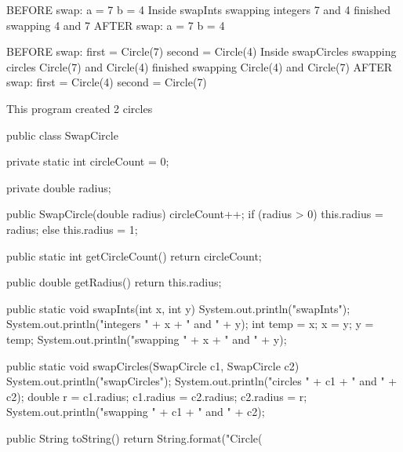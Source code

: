 \begin{answer}[14em]
\begin{minipage}{190pt}

\begin{javaans}
BEFORE swap:
a = 7
b = 4
    Inside swapInts
    swapping integers 7 and 4
    finished swapping 4 and 7
AFTER swap:
a = 7
b = 4
\end{javaans}

\end{minipage}
\hspace{1em}
\begin{minipage}{290pt}

\begin{javaans}
BEFORE swap:
first = Circle(7)
second = Circle(4)
	Inside swapCircles
	swapping circles Circle(7) and Circle(4)
	finished swapping Circle(4) and Circle(7)
AFTER swap:
first = Circle(4)
second = Circle(7)
\end{javaans}

\end{minipage}
\begin{javaans}
This program created 2 circles
\end{javaans}
\end{answer}


\newpage

\begin{javabox}
public class SwapCircle {
    
    private static int circleCount = 0;
    
    private double radius;
    
    public SwapCircle(double radius) {
        circleCount++;
        if (radius > 0) {
            this.radius = radius;
        } else {
            this.radius = 1;
        }
    }
    
    public static int getCircleCount() {
        return circleCount;
    }
    
    public double getRadius() {
        return this.radius;
    }
    
    public static void swapInts(int x, int y) {
        System.out.println("\tInside swapInts");
        System.out.println("\tswapping integers " + x + " and " + y);
        int temp = x;
        x = y;
        y = temp;
        System.out.println("\tfinished swapping " + x + " and " + y);
    }
    
    public static void swapCircles(SwapCircle c1, SwapCircle c2) {
        System.out.println("\tInside swapCircles");
        System.out.println("\tswapping circles " + c1 + " and " + c2);
        double r = c1.radius;
        c1.radius = c2.radius;
        c2.radius = r;
        System.out.println("\tfinished swapping " + c1 + " and " + c2);
    }
    
    public String toString() {
        return String.format("Circle(%
    }
}
\end{javabox}



